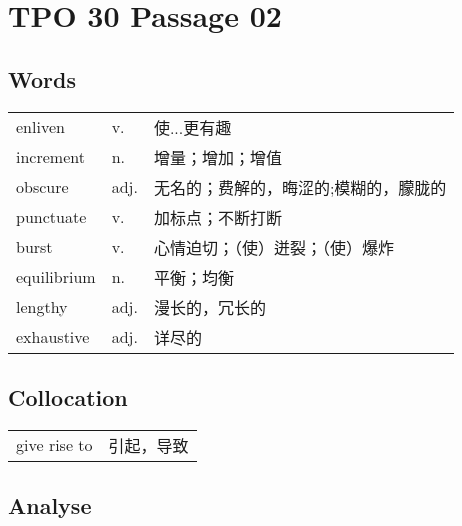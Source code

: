\section{TPO 30 Passage 02}

\subsection{Words}

\begin{tabular}{lll}
    enliven     & v.   & 使...更有趣             \\
    increment   & n.   & 增量；增加；增值            \\
    obscure     & adj. & 无名的；费解的，晦涩的;模糊的，朦胧的 \\
    punctuate   & v.   & 加标点；不断打断            \\
    burst       & v.   & 心情迫切；（使）迸裂；（使）爆炸    \\
    equilibrium & n.   & 平衡；均衡               \\
    lengthy     & adj. & 漫长的，冗长的             \\
    exhaustive  & adj. & 详尽的                 \\
\end{tabular}

\subsection{Collocation}

\begin{tabular}{ll}
    give rise to & 引起，导致 \\
\end{tabular}

\subsection{Analyse}

